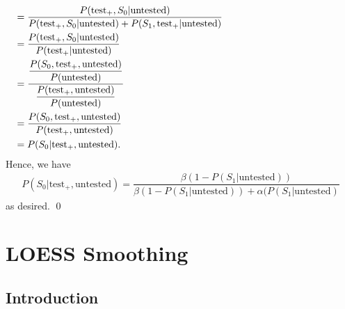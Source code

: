 \documentclass[12pt,twoside]{smiththesis}
\begin{document}
\begin{align*}
  &=  \dfrac{{P(\text{test}_+,S_0|\text{untested})}}{P(\text{test}_+,S_0|\text{untested}) +  P(S_1, \text{test}_+|\text{untested})} \hspace{45 mm }\\ 
   &=  \dfrac{{P(\text{test}_+,S_0|\text{untested})}}{P(\text{test}_+|\text{untested}) } \\
   &= \dfrac{\dfrac{P(S_0, \text{test}_+, \text{untested})}{P(\text{untested})}}{ \dfrac{P(\text{test}_+,\text{untested})}{P(\text{untested})}} \\ 
  &=\dfrac{P(S_0, \text{test}_+, \text{untested})}{P(\text{test}_+,\text{untested})} \\
  &= P(S_0 |\text{test}_+, \text{untested}).
\end{align*}
\noindent Hence, we have
\begin{align*}
P(S_0 |\text{test}_+, \text{untested}) = \dfrac{\beta (1- P(S_1|\text{untested}))}{\beta(1- P(S_1|\text{untested})) + \alpha(P(S_1|\text{untested})}
\end{align*}
\noindent as desired.
\qed

\newpage

\hypertarget{loess-smoothing}{%
\section{LOESS Smoothing}\label{loess-smoothing}}

\hypertarget{introduction}{%
\subsection{Introduction}\label{introduction}}
\end{document}

